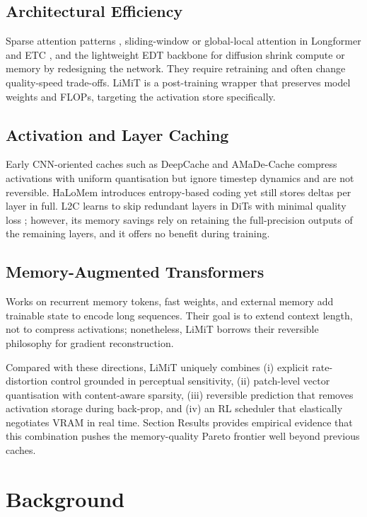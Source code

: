 \documentclass{article}
\begin{document}
\subsection{Architectural Efficiency}
Sparse attention patterns \cite{child-2019-generating}, sliding-window or global-local attention in Longformer \cite{beltagy-2020-longformer} and ETC \cite{ainslie-2020-etc}, and the lightweight EDT backbone for diffusion \cite{chen-2024-edt} shrink compute or memory by redesigning the network. They require retraining and often change quality-speed trade-offs. LiMiT is a post-training wrapper that preserves model weights and FLOPs, targeting the activation store specifically.

\subsection{Activation and Layer Caching}
Early CNN-oriented caches such as DeepCache and AMaDe-Cache compress activations with uniform quantisation but ignore timestep dynamics and are not reversible. HaLoMem introduces entropy-based coding yet still stores deltas per layer in full. L2C learns to skip redundant layers in DiTs with minimal quality loss \cite{ma-2024-learning}; however, its memory savings rely on retaining the full-precision outputs of the remaining layers, and it offers no benefit during training.

\subsection{Memory-Augmented Transformers}
Works on recurrent memory tokens, fast weights, and external memory \cite{burtsev-2020-memory,bulatov-2022-recurrent,ba-2016-using} add trainable state to encode long sequences. Their goal is to extend context length, not to compress activations; nonetheless, LiMiT borrows their reversible philosophy for gradient reconstruction.

Compared with these directions, LiMiT uniquely combines (i) explicit rate-distortion control grounded in perceptual sensitivity, (ii) patch-level vector quantisation with content-aware sparsity, (iii) reversible prediction that removes activation storage during back-prop, and (iv) an RL scheduler that elastically negotiates VRAM in real time. Section Results provides empirical evidence that this combination pushes the memory-quality Pareto frontier well beyond previous caches.

\section{Background}
\end{document}

